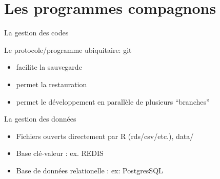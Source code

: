\documentclass[pdftex,xcolor={table}]{beamer} %
\begin{document}
\section{Les programmes compagnons}
  \begin{frame}{La gestion des codes}
    \begin{block}{Le protocole/programme ubiquitaire: git}
      \begin{itemize}
        \item facilite la sauvegarde
        \item permet la restauration
        \item permet le développement en parallèle de plusieurs ``branches''
      \end{itemize}
    \end{block}
  \end{frame}
  \begin{frame}{La gestion des données}
    \begin{itemize}
      \item Fichiers ouverts directement par R (rds/csv/etc.), data/
      \item Base clé-valeur : ex. REDIS 
      \item Base de données relationelle : ex: PostgresSQL
    \end{itemize}
  \end{frame}
\end{document}
